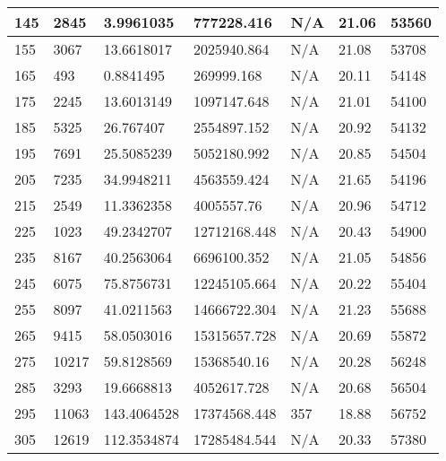 \begin{tabular}{|l||l|l|l||l|l|l|}
145  & 2845            & 3.9961035      & 777228.416       & N/A            & 21.06         & 53560           \\ \hline
155  & 3067            & 13.6618017     & 2025940.864      & N/A            & 21.08         & 53708           \\ \hline
165  & 493             & 0.8841495      & 269999.168       & N/A            & 20.11         & 54148           \\ \hline
175  & 2245            & 13.6013149     & 1097147.648      & N/A            & 21.01         & 54100           \\ \hline
185  & 5325            & 26.767407      & 2554897.152      & N/A            & 20.92         & 54132           \\ \hline
195  & 7691            & 25.5085239     & 5052180.992      & N/A            & 20.85         & 54504           \\ \hline
205  & 7235            & 34.9948211     & 4563559.424      & N/A            & 21.65         & 54196           \\ \hline
215  & 2549            & 11.3362358     & 4005557.76       & N/A            & 20.96         & 54712           \\ \hline
225  & 1023            & 49.2342707     & 12712168.448     & N/A            & 20.43         & 54900           \\ \hline
235  & 8167            & 40.2563064     & 6696100.352      & N/A            & 21.05         & 54856           \\ \hline
245  & 6075            & 75.8756731     & 12245105.664     & N/A            & 20.22         & 55404           \\ \hline
255  & 8097            & 41.0211563     & 14666722.304     & N/A            & 21.23         & 55688           \\ \hline
265  & 9415            & 58.0503016     & 15315657.728     & N/A            & 20.69         & 55872           \\ \hline
275  & 10217           & 59.8128569     & 15368540.16      & N/A            & 20.28         & 56248           \\ \hline
285  & 3293            & 19.6668813     & 4052617.728      & N/A            & 20.68         & 56504           \\ \hline
295  & 11063           & 143.4064528    & 17374568.448     & 357            & 18.88         & 56752           \\ \hline
305  & 12619           & 112.3534874    & 17285484.544     & N/A            & 20.33         & 57380           \\ \hline

\end{tabular}
